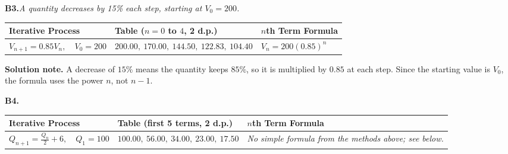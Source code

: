 \documentclass[12pt,a4paper]{article}
\begin{document}
\vspace{16pt}

\newpage{}

\noindent\textbf{B3.}\quad \textit{A quantity decreases by 15\% each step, starting at \(V_0 = 200\).}

\vspace{5pt}
\begin{center}
\renewcommand{\arraystretch}{1.4}
\begin{tabularx}{\linewidth}{|>{\centering\arraybackslash}X
                             |>{\centering\arraybackslash}X
                             |>{\centering\arraybackslash}X|}
\hline
\rowcolor{sectionbg}
\textbf{Iterative Process} & \textbf{Table ($n=0$ to $4$, 2 d.p.)} & \textbf{$n$th Term Formula} \\
\hline
\(V_{n+1} = 0.85V_n,\quad V_0 = 200\) & \(200.00,\ 170.00,\ 144.50,\ 122.83,\ 104.40\) & \(V_n = 200(0.85)^n\) \\
\hline
\end{tabularx}
\end{center}

\medskip
\noindent\textbf{Solution note.} A decrease of \(15\%\) means the quantity keeps \(85\%\), so it is multiplied by \(0.85\) at each step. Since the starting value is \(V_0\), the formula uses the power \(n\), not \(n-1\).

\vspace{16pt}

\noindent\textbf{B4.}

\vspace{5pt}
\begin{center}
\renewcommand{\arraystretch}{1.4}
\begin{tabularx}{\linewidth}{|>{\centering\arraybackslash}X
                             |>{\centering\arraybackslash}X
                             |>{\centering\arraybackslash}X|}
\hline
\rowcolor{sectionbg}
\textbf{Iterative Process} & \textbf{Table (first 5 terms, 2 d.p.)} & \textbf{$n$th Term Formula} \\
\hline
\(Q_{n+1} = \frac{Q_n}{2} + 6,\quad Q_1 = 100\) & \(100.00,\ 56.00,\ 34.00,\ 23.00,\ 17.50\) & \textit{No simple formula from the methods above; see below.} \\
\hline
\end{tabularx}
\end{center}
\end{document}
